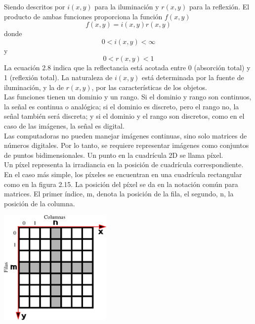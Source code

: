 Siendo descritos por $i(x,y)$ para la iluminación y $r(x,y)$ para la reflexión. El producto de ambas funciones
proporciona la función $f(x,y)$
\begin{equation}
	f(x,y) = i(x,y)r(x,y)
\end{equation}
donde
\begin{equation}
	0 < i(x,y) < \infty
\end{equation}
y
\begin{equation}
	0 < r(x,y) < 1
\end{equation}
La ecuación 2.8 indica que la reflectancia está acotada entre 0 (absorción total) y
1 (reflexión total). La naturaleza de $i(x,y)$ está determinada por la fuente de iluminación, y la de $r(x,y)$, por
las características de los objetos.\\
Las funciones tienen un
dominio y un rango. Si el dominio y rango son continuos, la señal es continua o
analógica; si el dominio es discreto, pero el rango no, la señal también será discreta; y si
el dominio y el rango son discretos, como en el caso de las imágenes, la señal es digital.\\
Las computadoras no pueden manejar imágenes continuas, sino solo matrices de números digitales. Por lo tanto, se
requiere representar imágenes como conjuntos de puntos bidimensionales. Un punto en la cuadrícula 2D se llama píxel.\\
Un píxel representa la irradiancia en la posición de cuadrícula correspondiente. En el caso más simple, los píxeles se encuentran
en una cuadrícula rectangular como en la figura 2.15. La posición del píxel se da en la notación común para matrices.
El primer índice, m, denota la posición de la fila, el segundo, n, la posición de la columna.
\begin{center}
	\includegraphics[width=0.41\textwidth]{Contenido/Cuerpo/Capitulo2/Fig8.eps}
	\label{fig:MarcoTeorico:Fig17}
\end{center}

